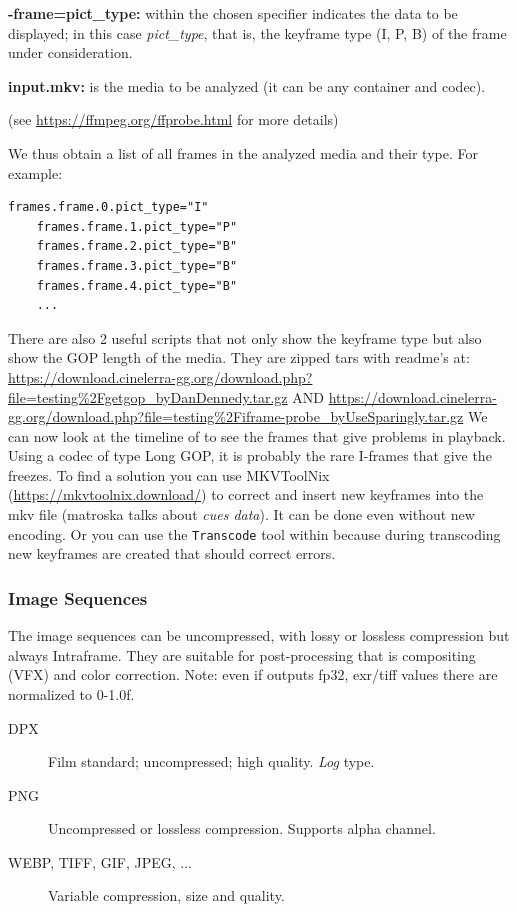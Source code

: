 \textbf{-frame=pict\_type:} within the chosen specifier indicates the data to be displayed; in this case \textit{pict\_type}, that is, the keyframe type (I, P, B) of the frame under consideration.

\textbf{input.mkv:} is the media to be analyzed (it can be any container and codec).

(see {\small\url{https://ffmpeg.org/ffprobe.html}} for more details)

We thus obtain a list of all frames in the analyzed media and their type. For example:

\begin{lstlisting}[numbers=none]
	frames.frame.0.pict_type="I"
	frames.frame.1.pict_type="P"
	frames.frame.2.pict_type="B"
	frames.frame.3.pict_type="B"
	frames.frame.4.pict_type="B"
	...
\end{lstlisting}

There are also 2 useful scripts that not only show the keyframe type but also show the GOP length of the media. They are zipped tars with readme's at: \newline
{\small\url{https://download.cinelerra-gg.org/download.php?file=testing\%2Fgetgop_byDanDennedy.tar.gz}}   AND \newline 
{\small\url{https://download.cinelerra-gg.org/download.php?file=testing\%2Fiframe-probe_byUseSparingly.tar.gz}}
We can now look at the timeline of \CGG{} to see the frames that give problems in playback. Using a codec of type Long GOP, it is probably the rare I-frames that give the freezes.
To find a solution you can use MKVToolNix ({\small\url{https://mkvtoolnix.download/}}) to correct and insert new keyframes into the mkv file (matroska talks about \textit{cues data}). It can be done even without new encoding. Or you can use the \texttt{Transcode} tool within \CGG{} because during transcoding new keyframes are created that should correct errors.

\subsubsection{Image Sequences}
\label{ssub:ffmpeg_image_sequences}

The image sequences can be uncompressed, with lossy or lossless compression but always Intraframe. They are suitable for post-processing that is compositing (VFX) and color correction. Note: even if \CGG{} outputs fp32, exr/tiff values there are normalized to 0-1.0f.

\begin{description}
	\item[DPX] Film standard; uncompressed; high quality. \textit{Log} type.
	\item[PNG] Uncompressed or lossless compression. Supports alpha channel.
	\item[WEBP, TIFF, GIF, JPEG, ...] Variable compression, size and quality.
\end{description}

